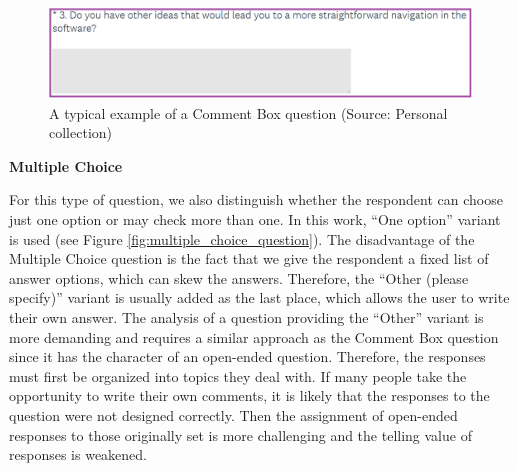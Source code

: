 \documentclass[a4paper,10pt,twoside]{article}
\begin{document}
\vspace{0.3cm}
\begin{figure}[hbt!] 
\begin{center}
\includegraphics[width=15cm]{../pictures/comment_box_question.png} 
\caption[A typical example of a Comment Box question]{A typical example of a Comment Box question (Source: Personal collection)}
\label{fig:comment_box_question}
\end{center}
\end{figure}

\newpage
\vspace*{-1cm}
\bigskip
\noindent \textbf {Multiple Choice}

\noindent For this type of question, we also distinguish whether the
respondent can choose just one option or may check more than one. In
this work, ``One option'' variant is used (see Figure
\ref{fig:multiple_choice_question}). The disadvantage of the Multiple
Choice question is the fact that we give the respondent a fixed list
of answer options, which can skew the answers. Therefore, the ``Other
(please specify)'' variant is usually added as the last place, which
allows the user to write their own answer. The analysis of a question
providing the ``Other'' variant is more demanding and requires a
similar approach as the Comment Box question since it has the
character of an open-ended question. Therefore, the responses must
first be organized into topics they deal with. If many people take the
opportunity to write their own comments, it is likely that the
responses to the question were not designed correctly. Then the
assignment of open-ended responses to those originally set is more
challenging and the telling value of responses is weakened.
\end{document}
